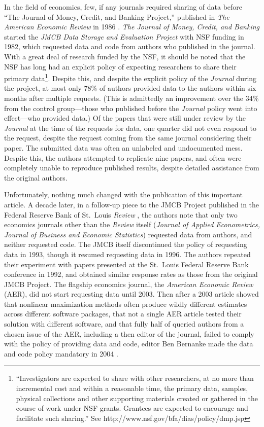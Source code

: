 \documentclass[12pt] {article}
\begin{document}
In the field of economics, few, if any journals required sharing of data
before ``The Journal of Money, Credit, and Banking Project,'' published
in \emph{The American Economic Review} in 1986 \citep{dewald_replication_1986}. \emph{The Journal of Money, Credit, and Banking} started
the \emph{JMCB Data Storage and Evaluation Project} with NSF funding in
1982, which requested data and code from authors who published in the
journal. With a great deal of research funded by the NSF, it should be
noted that the NSF has long had an explicit policy of expecting
researchers to share their primary data\footnote{``Investigators are
  expected to share with other researchers, at no more than incremental
  cost and within a reasonable time, the primary data, samples, physical
  collections and other supporting materials created or gathered in the
  course of work under NSF grants. Grantees are expected to encourage
  and facilitate such sharing.'' See
  http://www.nsf.gov/bfa/dias/policy/dmp.jsp}. Despite this, and despite
the explicit policy of the \emph{Journal} during the project, at most
only 78\% of authors provided data to the authors within six months
after multiple requests. (This is admittedly an improvement over the
34\% from the control group---those who published before the
\emph{Journal} policy went into effect---who provided data.) Of the
papers that were still under review by the \emph{Journal} at the time of
the requests for data, one quarter did not even respond to the request,
despite the request coming from the same journal considering their
paper. The submitted data was often an unlabeled and undocumented mess.
Despite this, the authors attempted to replicate nine papers, and often
were completely unable to reproduce published results, despite detailed
assistance from the original authors.

Unfortunately, nothing much changed with the publication of this important
article. A decade later, in a follow-up piece to the JMCB Project
published in the Federal Reserve Bank of St.~Louis \emph{Review}
\citep{anderson_replication_1994}, the authors note that only two economics
journals other than the \emph{Review} itself (\emph{Journal of Applied
Econometrics, Journal of Business and Economic Statistics}) requested
data from authors, and neither requested code. The JMCB itself
discontinued the policy of requesting data in 1993, though it resumed
requesting data in 1996. The authors repeated their experiment with
papers presented at the St.~Louis Federal Reserve Bank conference in
1992, and obtained similar response rates as those from the original JMCB Project. The
flagship economics journal, the \emph{American Economic Review} (AER),
did not start requesting data until 2003. Then after a 2003 article
showed that nonlinear maximization methods often produce wildly
different estimates across different software packages, that not a
single AER article tested their solution with different software, and
that fully half of queried authors from a chosen issue of the AER,
including a then editor of the journal, failed to comply with the policy
of providing data and code, editor Ben Bernanke made the data and code
policy mandatory in 2004 \citep{mccullough_verifying_2003, Bernanke2004}.
\end{document}
